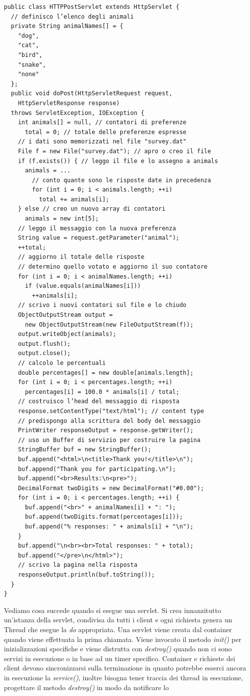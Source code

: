 \documentclass[a4paper,12pt, oneside]{book}
\begin{document}
\begin{verbatim}
public class HTTPPostServlet extends HttpServlet {
  // definisco l’elenco degli animali
  private String animalNames[] = {
    "dog",
    "cat",
    "bird",
    "snake",
    "none"
  };
  public void doPost(HttpServletRequest request,
    HttpServletResponse response)
  throws ServletException, IOException {
    int animals[] = null, // contatori di preferenze
      total = 0; // totale delle preferenze espresse
    // i dati sono memorizzati nel file "survey.dat"
    File f = new File("survey.dat"); // apro o creo il file
    if (f.exists()) { // leggo il file e lo assegno a animals
      animals = ...
        // conto quante sono le risposte date in precedenza
        for (int i = 0; i < animals.length; ++i)
          total += animals[i];
    } else // creo un nuovo array di contatori
      animals = new int[5];
    // leggo il messaggio con la nuova preferenza
    String value = request.getParameter("animal");
    ++total;
    // aggiorno il totale delle risposte
    // determino quello votato e aggiorno il suo contatore
    for (int i = 0; i < animalNames.length; ++i)
      if (value.equals(animalNames[i]))
        ++animals[i];
    // scrivo i nuovi contatori sul file e lo chiudo
    ObjectOutputStream output =
      new ObjectOutputStream(new FileOutputStream(f));
    output.writeObject(animals);
    output.flush();
    output.close();
    // calcolo le percentuali
    double percentages[] = new double[animals.length];
    for (int i = 0; i < percentages.length; ++i)
      percentages[i] = 100.0 * animals[i] / total;
    // costruisco l’head del messaggio di risposta
    response.setContentType("text/html"); // content type
    // predispongo alla scrittura del body del messaggio
    PrintWriter responseOutput = response.getWriter();
    // uso un Buffer di servizio per costruire la pagina
    StringBuffer buf = new StringBuffer();
    buf.append("<html>\n<title>Thank you!</title>\n");
    buf.append("Thank you for participating.\n");
    buf.append("<br>Results:\n<pre>");
    DecimalFormat twoDigits = new DecimalFormat("#0.00");
    for (int i = 0; i < percentages.length; ++i) {
      buf.append("<br>" + animalNames[i] + ": ");
      buf.append(twoDigits.format(percentages[i]));
      buf.append("% responses: " + animals[i] + "\n");
    }
    buf.append("\n<br><br>Total responses: " + total);
    buf.append("</pre>\n</html>");
    // scrivo la pagina nella risposta
    responseOutput.println(buf.toString());
  }
}
\end{verbatim}
Vediamo cosa succede quando si esegue una servlet. Si crea innanzitutto un'istanza della servlet, condivisa da tutti i client e ogni richiesta genera un Thread che esegue la \textit{do} appropriata. Una servlet viene creata dal container quando viene effettuata la prima chiamata. Viene invocato il metodo \textit{init()} per inizializzazioni specifiche e viene distrutta con \textit{destroy()} quando non ci sono servizi in esecuzione o in base ad un timer specifico. Container e richieste dei client devono sincronizzarsi sulla terminazione in quanto potrebbe esserci ancora in esecuzione la \textit{service()}, inoltre bisogna tener traccia dei thread in esecuzione, progettare il metodo \textit{destroy()} in modo da notificare lo
\end{document}
